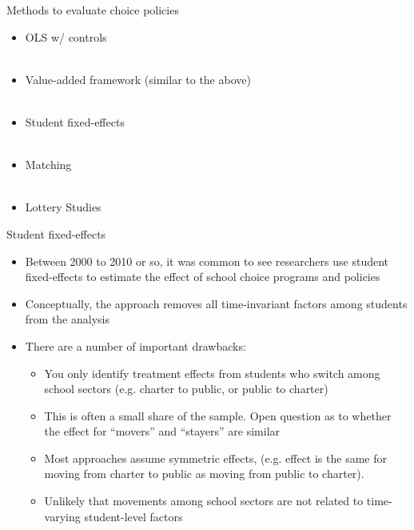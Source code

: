 \documentclass{beamer}
\begin{document}
\begin{frame}[<+->]{Methods to evaluate choice policies}
	\begin{itemize}
		\item OLS w/ controls  \\~\\
		\item Value-added framework (similar to the above) \\~\\
		\item Student fixed-effects \\~\\
		\item Matching \\~\\
		\item Lottery Studies 
	\end{itemize}

\end{frame}

\begin{frame}[<+->]{Student fixed-effects}
	\begin{itemize}
		\item Between 2000 to 2010 or so, it was common to see researchers use student fixed-effects to estimate the effect of school choice programs and policies
		\item Conceptually, the approach removes all time-invariant factors among students from the analysis
		\item There are a number of important drawbacks:
		\begin{itemize}
			\item You only identify treatment effects from students who switch among school sectors (e.g. charter to public, or public to charter)
			\item This is often a small share of the sample. Open question as to whether the effect for ``movers'' and ``stayers'' are similar
			\item Most approaches assume symmetric effects, (e.g. effect is the same for moving from charter to public as moving from public to charter). 
			\item Unlikely that movements among school sectors are not related to time-varying student-level factors
		\end{itemize} 
	\end{itemize}

\end{frame}
\end{document}

